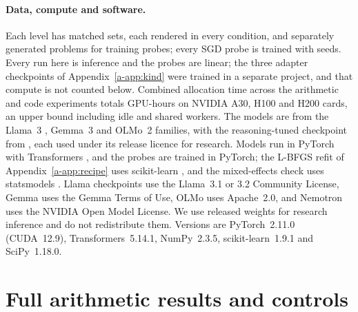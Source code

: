 \paragraph{Data, compute and software.} Each level has  matched sets, each
rendered in every condition, and  separately generated problems for
training probes; every SGD probe is trained with  seeds. Every run here is
inference and the probes are linear; the three adapter checkpoints of Appendix~\ref{a-app:kind}
were trained in a separate project, and that compute is not counted below. Combined allocation time across the arithmetic and code experiments totals  GPU-hours on NVIDIA A30, H100 and H200 cards, an upper bound including idle and shared workers.
The models are from the Llama~3 \citep{grattafiori2024llama3}, Gemma~3 \citep{gemmateam2025gemma3}
and OLMo~2 \citep{olmo2024olmo2,walsh2025olmo2} families, with the reasoning-tuned checkpoint from
\citet{bercovich2025nemotron}, each used under its release licence for research. Models run in
PyTorch \citep{paszke2019pytorch} with Transformers \citep{wolf2020transformers}, and the probes are
trained in PyTorch; the L-BFGS refit of Appendix~\ref{a-app:recipe} uses scikit-learn
\citep{pedregosa2011sklearn}, and the mixed-effects check uses statsmodels
\citep{seabold2010statsmodels}.
Llama checkpoints use the Llama~3.1 or 3.2 Community License, Gemma uses the Gemma Terms
of Use, OLMo uses Apache~2.0, and Nemotron uses the NVIDIA Open Model License.
We use released weights for research inference and do not redistribute them.
Versions are PyTorch~2.11.0 (CUDA~12.9), Transformers~5.14.1, NumPy~2.3.5,
scikit-learn~1.9.1 and SciPy~1.18.0.

\section{Full arithmetic results and controls}
\begin{table}[t]
\centering\small
\resizebox{\textwidth}{!}{}
\caption{Arithmetic level 3. Accuracy (\%); name effects (points). *Reliable across demonstration sets.}
\label{a-tab:behavior}
\end{table}

\begin{table}[t]
\centering\small

\caption{The level-3 model below the preregistered 90\% mean neutral-CoT accuracy floor,
excluded from the accuracy-filtered behavioral table. Columns and claim markers follow Table~\ref{a-tab:behavior}.}
\label{a-tab:excluded}
\end{table}

